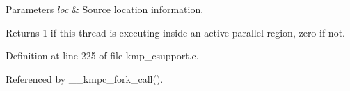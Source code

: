 \begin{DoxyParams}{Parameters}
{\em loc} & Source location information. \\
\hline
\end{DoxyParams}
\begin{DoxyReturn}{Returns}
1 if this thread is executing inside an active parallel region, zero if not. 
\end{DoxyReturn}


Definition at line 225 of file kmp\-\_\-csupport.\-c.



Referenced by \-\_\-\-\_\-kmpc\-\_\-fork\-\_\-call().

